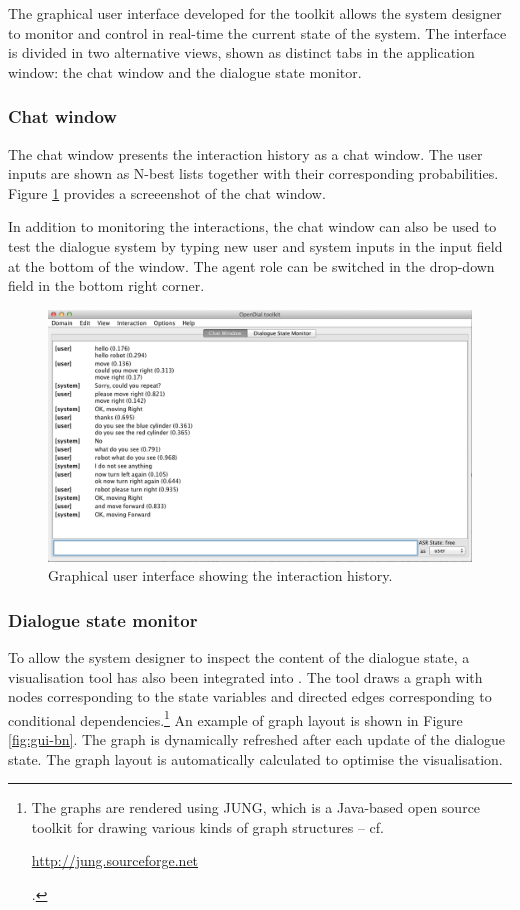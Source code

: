 The graphical user interface developed for the \opendial toolkit allows the system designer to monitor and control in real-time the current state of the system.  The interface is divided in two alternative views, shown as distinct tabs in the application window: the chat window and the dialogue state monitor.

\subsubsection*{Chat window}
The chat window presents the interaction history as a chat window.  The user inputs are shown as N-best lists together with their corresponding probabilities.  Figure \ref{fig:gui-chatbox} provides a screeenshot of the chat window. 

In addition to monitoring the interactions, the chat window can also be used to test the dialogue system by typing new user and system inputs in the input field at the bottom of the window.  The agent role can be switched in the drop-down field in the bottom right corner. 

\begin{figure}[h]
\centering
\includegraphics[scale=0.40]{imgs/gui-chatbox.png}
\caption{Graphical user interface showing the interaction history.}
\label{fig:gui-chatbox}
\end{figure}

\subsubsection*{Dialogue state monitor}

To allow the system designer to inspect the content of the dialogue state, a visualisation tool has also been integrated into \opendial .  The tool draws a graph with nodes corresponding to the state variables and directed edges corresponding to conditional dependencies.\footnote{The graphs are rendered using JUNG, which is a Java-based open source toolkit for drawing various kinds of graph structures -- cf. \begin{scriptsize}\url{http://jung.sourceforge.net}\end{scriptsize}.} An example of graph layout is shown in Figure \ref{fig:gui-bn}. The graph is dynamically refreshed after each update of the dialogue state. The graph layout is automatically calculated to optimise the visualisation. 

